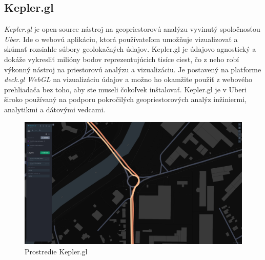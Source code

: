 \subsection{Kepler.gl}
\indent \indent \textit{Kepler.gl} je open-source nástroj na geopriestorovú analýzu vyvinutý spoločnosťou \textit{Uber}. Ide o webovú aplikáciu, ktorá používateľom umožňuje vizualizovať a skúmať rozsiahle súbory geolokačných údajov. Kepler.gl je údajovo agnostický a dokáže vykresliť milióny bodov reprezentujúcich tisíce ciest, čo z neho robí výkonný nástroj na priestorovú analýzu a vizualizáciu. Je postavený na platforme \textit{deck.gl WebGL} na vizualizáciu údajov a možno ho okamžite použiť z webového prehliadača bez toho, aby ste museli čokoľvek inštalovať. Kepler.gl je v Uberi široko používaný na podporu pokročilých geopriestorových analýz inžiniermi, analytikmi a dátovými vedcami\cite{kepler1}\cite{kepler2}\cite{kepler3}.
\begin{figure}[H]
    \centering
    \includegraphics[width = \linewidth]{img/kepler.png}
    \caption{Prostredie Kepler.gl}
\end{figure}
